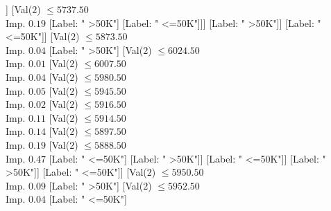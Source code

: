 \documentclass[margin=10pt]{standalone}
\begin{document}
\begin{forest}
																																				[Val($2$) $ \leq 5797.50$ \\ Imp. $0.08$
																																					[Val($2$) $ \leq 5718.50$ \\ Imp. $0.03$
																																						[Val($2$) $ \leq 5621.50$ \\ Imp. $0.09$
																																							[Label: " >50K"]
																																							[Label: " <=50K"]]
																																						[Val($2$) $ \leq 5737.50$ \\ Imp. $0.19$
																																							[Label: " >50K"]
																																							[Label: " <=50K"]]]
																																					[Label: " >50K"]]
																																				[Label: " <=50K"]]
																																			[Val($2$) $ \leq 5873.50$ \\ Imp. $0.04$
																																				[Label: " >50K"]
																																				[Val($2$) $ \leq 6024.50$ \\ Imp. $0.01$
																																					[Val($2$) $ \leq 6007.50$ \\ Imp. $0.04$
																																						[Val($2$) $ \leq 5980.50$ \\ Imp. $0.05$
																																							[Val($2$) $ \leq 5945.50$ \\ Imp. $0.02$
																																								[Val($2$) $ \leq 5916.50$ \\ Imp. $0.11$
																																									[Val($2$) $ \leq 5914.50$ \\ Imp. $0.14$
																																										[Val($2$) $ \leq 5897.50$ \\ Imp. $0.19$
																																											[Val($2$) $ \leq 5888.50$ \\ Imp. $0.47$
																																												[Label: " <=50K"]
																																												[Label: " >50K"]]
																																											[Label: " <=50K"]]
																																										[Label: " >50K"]]
																																									[Label: " <=50K"]]
																																								[Val($2$) $ \leq 5950.50$ \\ Imp. $0.09$
																																									[Label: " >50K"]
																																									[Val($2$) $ \leq 5952.50$ \\ Imp. $0.04$
																																										[Label: " <=50K"]

\end{forest}
\end{document}
